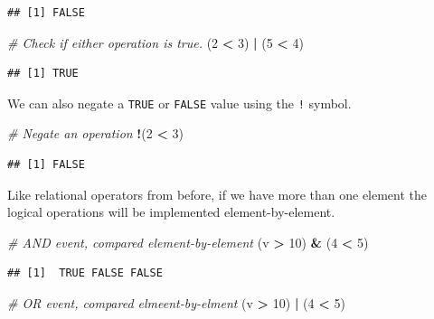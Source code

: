 \documentclass[
]{book}
\newenvironment{Shaded}{\begin{snugshade}}{\end{snugshade}}
\newcommand{\CommentTok}[1]{\textcolor[rgb]{0.56,0.35,0.01}{\textit{#1}}}
\newcommand{\DecValTok}[1]{\textcolor[rgb]{0.00,0.00,0.81}{#1}}
\newcommand{\NormalTok}[1]{#1}
\newcommand{\OperatorTok}[1]{\textcolor[rgb]{0.81,0.36,0.00}{\textbf{#1}}}
\newcommand{\StringTok}[1]{\textcolor[rgb]{0.31,0.60,0.02}{#1}}
\begin{document}
\begin{verbatim}
## [1] FALSE
\end{verbatim}

\begin{Shaded}
\begin{Highlighting}[]
\CommentTok{# Check if either operation is true.}
\NormalTok{(}\DecValTok{2} \OperatorTok{<}\StringTok{ }\DecValTok{3}\NormalTok{) }\OperatorTok{|}\StringTok{ }\NormalTok{(}\DecValTok{5} \OperatorTok{<}\StringTok{ }\DecValTok{4}\NormalTok{)}
\end{Highlighting}
\end{Shaded}

\begin{verbatim}
## [1] TRUE
\end{verbatim}

We can also negate a \texttt{TRUE} or \texttt{FALSE} value using the \texttt{!} symbol.

\begin{Shaded}
\begin{Highlighting}[]
\CommentTok{# Negate an operation}
\OperatorTok{!}\NormalTok{(}\DecValTok{2} \OperatorTok{<}\StringTok{ }\DecValTok{3}\NormalTok{)}
\end{Highlighting}
\end{Shaded}

\begin{verbatim}
## [1] FALSE
\end{verbatim}

Like relational operators from before, if we have more than one element the logical operations will be implemented element-by-element.

\begin{Shaded}
\begin{Highlighting}[]
\CommentTok{# AND event, compared element-by-element}
\NormalTok{(v }\OperatorTok{>}\StringTok{ }\DecValTok{10}\NormalTok{) }\OperatorTok{&}\StringTok{ }\NormalTok{(}\DecValTok{4} \OperatorTok{<}\StringTok{ }\DecValTok{5}\NormalTok{)}
\end{Highlighting}
\end{Shaded}

\begin{verbatim}
## [1]  TRUE FALSE FALSE
\end{verbatim}

\begin{Shaded}
\begin{Highlighting}[]
\CommentTok{# OR event, compared elmeent-by-elment}
\NormalTok{(v }\OperatorTok{>}\StringTok{ }\DecValTok{10}\NormalTok{) }\OperatorTok{|}\StringTok{ }\NormalTok{(}\DecValTok{4} \OperatorTok{<}\StringTok{ }\DecValTok{5}\NormalTok{)}
\end{Highlighting}
\end{Shaded}
\end{document}

